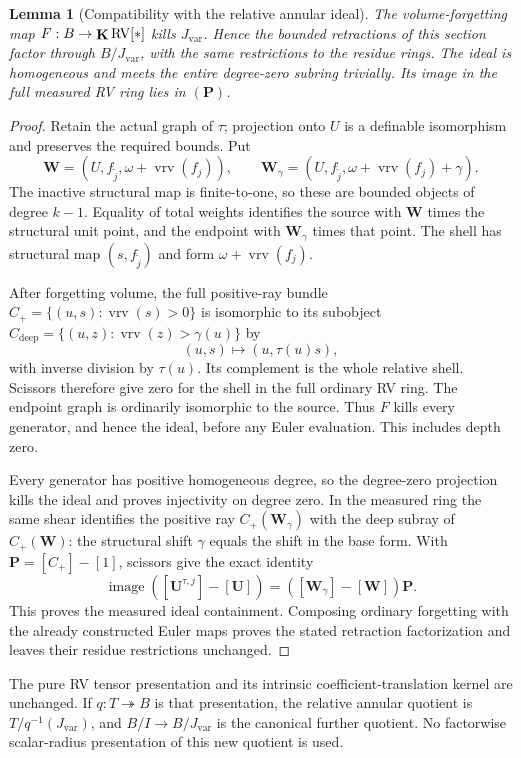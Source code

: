 \documentclass[12pt]{amsart}
\theoremstyle{plain}
\newtheorem{lem}[thm]{Lemma}
\theoremstyle{definition}
\theoremstyle{remark}
\numberwithin{equation}{section}
\theoremstyle{plain}
\newcommand{\RV}{\textup{RV}}
\newcommand{\0}{\emptyset}
\DeclareMathOperator{\ggk}{\mathbf{K}}
\DeclareMathOperator{\vrv}{vrv}
\begin{document}
\begin{lem}[Compatibility with the relative annular ideal]\label{relative:annular:compatibility}
The volume-forgetting map $F:B\to\ggk\RV[*]$ kills
$J_{\mathrm{var}}$. Hence the bounded retractions of this section
factor through $B/J_{\mathrm{var}}$, with the same restrictions
to the residue rings. The ideal is homogeneous and meets the entire
degree-zero subring trivially. Its image in the full measured RV ring
lies in $(\bm P)$.
\end{lem}
\begin{proof}
Retain the actual graph of $\tau$; projection onto $U$ is a definable
isomorphism and preserves the required bounds. Put
\[
 \bm W=(U,f_{\widetilde j},\omega+\vrv(f_j)),\qquad
 \bm W_\gamma=(U,f_{\widetilde j},\omega+\vrv(f_j)+\gamma).
\]
The inactive structural map is finite-to-one, so these are bounded
objects of degree $k-1$. Equality of total weights identifies the
source with $\bm W$ times the structural unit point, and the endpoint
with $\bm W_\gamma$ times that point. The shell has structural map
$(s,f_{\widetilde j})$ and form $\omega+\vrv(f_j)$.

After forgetting volume, the full positive-ray bundle
$C_+=\{(u,s):\vrv(s)>0\}$ is isomorphic to its subobject
$C_{\mathrm{deep}}=\{(u,z):\vrv(z)>\gamma(u)\}$ by
\[
 (u,s)\longmapsto(u,\tau(u)s),
\]
with inverse division by $\tau(u)$. Its complement is the whole
relative shell. Scissors therefore give zero for the shell in the
full ordinary RV ring. The endpoint graph is ordinarily isomorphic
to the source. Thus $F$ kills every generator, and hence the ideal,
before any Euler evaluation. This includes depth zero.

Every generator has positive homogeneous degree, so the degree-zero
projection kills the ideal and proves injectivity on degree zero.
In the measured ring the same shear identifies the positive ray
$C_+(\bm W_\gamma)$ with the deep subray of $C_+(\bm W)$:
the structural shift $\gamma$ equals the shift in the base form.
With $\bm P=[C_+]-[1]$, scissors give the exact identity
\[
 \operatorname{image}([\bm U^{\tau,j}]-[\bm U])
   =([\bm W_\gamma]-[\bm W])\bm P.
\]
This proves the measured ideal containment. Composing ordinary
forgetting with the already constructed Euler maps proves the stated
retraction factorization and leaves their residue restrictions unchanged.
\end{proof}

The pure RV tensor presentation and its intrinsic coefficient-translation
kernel are unchanged. If $q:T\twoheadrightarrow B$ is that presentation,
the relative annular quotient is $T/q^{-1}(J_{\mathrm{var}})$, and
$B/I\to B/J_{\mathrm{var}}$ is the canonical further quotient.
No factorwise scalar-radius presentation of this new quotient is used.
\end{document}
